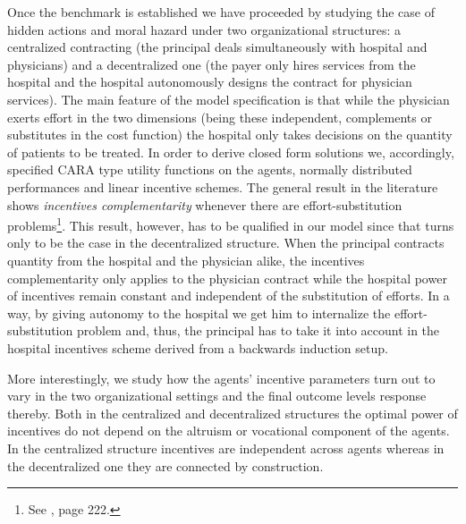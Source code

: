 \documentclass[12pt,letterpaper]{article}
\begin{document}
Once the benchmark is established we have proceeded by studying the case of hidden actions and moral hazard under two organizational structures: a centralized contracting (the principal deals simultaneously with hospital and physicians) and a decentralized one (the payer only hires services from the hospital and the hospital autonomously designs the contract for physician services). The main feature of the model specification is that while the physician exerts effort in the two dimensions (being these independent, complements or substitutes in the cost function) the hospital only takes decisions on the quantity of patients to be treated. In order to derive closed form solutions we, accordingly, specified CARA type utility functions on the agents, normally distributed performances and linear incentive schemes. The general result in the literature shows \emph{incentives complementarity }whenever there are effort-substitution problems\footnote{See \cite{Bolton05}, page 222.}. This result, however, has to be qualified in our model since that turns only to be the case in the decentralized structure. When the principal contracts quantity from the hospital and the physician alike, the incentives complementarity only applies to the physician contract while the hospital power of incentives remain constant and independent of the substitution of efforts. In a way, by giving autonomy to the hospital we get him to internalize the effort-substitution problem and, thus, the principal has to take it into account in the hospital incentives scheme derived from a backwards induction setup.

More interestingly, we study how the agents'  incentive parameters turn out to vary  in the two organizational settings and the final outcome levels response thereby.
Both in the centralized and decentralized structures the optimal power of incentives do not depend on the altruism or vocational component of the agents. In the centralized structure  incentives are independent across agents whereas in the decentralized one they are connected by construction. %

\end{document}
